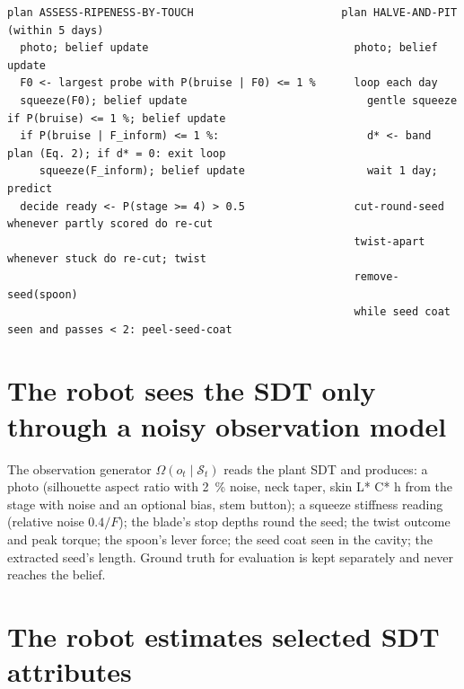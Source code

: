 \documentclass[10.5pt,a4paper]{article}
\begin{document}
\par\medskip{}\par\nopagebreak\vspace{2pt}\begin{Verbatim}[fontsize=\scriptsize,frame=lines,framesep=2mm,breaklines]
plan ASSESS-RIPENESS-BY-TOUCH                       plan HALVE-AND-PIT (within 5 days)
  photo; belief update                                photo; belief update
  F0 <- largest probe with P(bruise | F0) <= 1 %      loop each day
  squeeze(F0); belief update                            gentle squeeze if P(bruise) <= 1 %; belief update
  if P(bruise | F_inform) <= 1 %:                       d* <- band plan (Eq. 2); if d* = 0: exit loop
     squeeze(F_inform); belief update                   wait 1 day; predict
  decide ready <- P(stage >= 4) > 0.5                 cut-round-seed      whenever partly scored do re-cut
                                                      twist-apart         whenever stuck do re-cut; twist
                                                      remove-seed(spoon)
                                                      while seed coat seen and passes < 2: peel-seed-coat
\end{Verbatim}
\section{The robot sees the SDT only through a noisy observation model}
The observation generator $\Omega(o_t\mid\mathcal{S}_t)$ reads the plant SDT and produces: a photo (silhouette aspect
ratio with 2~\% noise, neck taper, skin L* C* h from the stage with noise and an optional bias, stem button); a
squeeze stiffness reading (relative noise $0.4/F$); the blade's stop depths round the seed; the twist outcome and
peak torque; the spoon's lever force; the seed coat seen in the cavity; the extracted seed's length. Ground truth for
evaluation is kept separately and never reaches the belief.

\section{The robot estimates selected SDT attributes}
\end{document}
